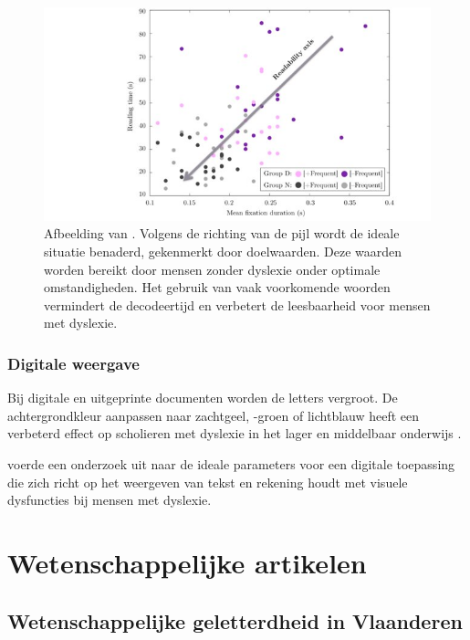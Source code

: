 \begin{figure}
	\includegraphics[width=\linewidth]{img/readability-mean-fixation-duration.png}
	\caption{Afbeelding van \textcite{Rello2013}. Volgens de richting van de pijl wordt de ideale situatie benaderd, gekenmerkt door doelwaarden. Deze waarden worden bereikt door mensen zonder dyslexie onder optimale omstandigheden. Het gebruik van vaak voorkomende woorden vermindert de decodeertijd en verbetert de leesbaarheid voor mensen met dyslexie.}
\end{figure}


\subsubsection{Digitale weergave}

Bij digitale en uitgeprinte documenten worden de letters vergroot. De achtergrondkleur aanpassen naar zachtgeel, -groen of lichtblauw heeft een verbeterd effect op scholieren met dyslexie in het lager en middelbaar onderwijs \autocite{Bezem2016, Rello2017}. 

\textcite{Rello2012} voerde een onderzoek uit naar de ideale parameters voor een digitale toepassing die zich richt op het weergeven van tekst en rekening houdt met visuele dysfuncties bij mensen met dyslexie.


\section{Wetenschappelijke artikelen}

\subsection{Wetenschappelijke geletterdheid in Vlaanderen}

